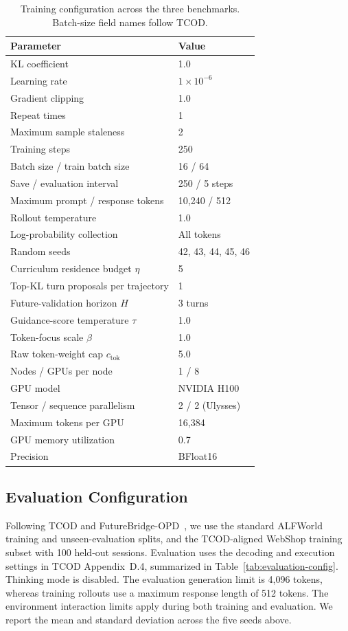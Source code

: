 \documentclass{article}
\begin{document}
\begin{table}[H]
\centering
\small
\caption{Training configuration across the three benchmarks. Batch-size field names follow TCOD.}
\label{tab:training-config}
\begin{tabular}{ll}
\toprule
Parameter & Value \\
\midrule
KL coefficient & 1.0 \\
Learning rate & $1\times10^{-6}$ \\
Gradient clipping & 1.0 \\
Repeat times & 1 \\
Maximum sample staleness & 2 \\
Training steps & 250 \\
Batch size / train batch size & 16 / 64 \\
Save / evaluation interval & 250 / 5 steps \\
Maximum prompt / response tokens & 10,240 / 512 \\
Rollout temperature & 1.0 \\
Log-probability collection & All tokens \\
Random seeds & 42, 43, 44, 45, 46 \\
\midrule
Curriculum residence budget $\eta$ & 5 \\
Top-KL turn proposals per trajectory & 1 \\
Future-validation horizon $H$ & 3 turns \\
Guidance-score temperature $\tau$ & 1.0 \\
Token-focus scale $\beta$ & 1.0 \\
Raw token-weight cap $c_{\mathrm{tok}}$ & 5.0 \\
\midrule
Nodes / GPUs per node & 1 / 8 \\
GPU model & NVIDIA H100 \\
Tensor / sequence parallelism & 2 / 2 (Ulysses) \\
Maximum tokens per GPU & 16,384 \\
GPU memory utilization & 0.7 \\
Precision & BFloat16 \\
\bottomrule
\end{tabular}
\end{table}

\subsection{Evaluation Configuration}
Following TCOD and FutureBridge-OPD~\citep{wang2026tcod,chen2026look}, we use the
standard ALFWorld training and unseen-evaluation splits, and the TCOD-aligned WebShop
training subset with 100 held-out sessions.  Evaluation uses the decoding and execution
settings in TCOD Appendix~D.4, summarized in Table~\ref{tab:evaluation-config}. Thinking
mode is disabled. The evaluation generation limit is 4,096 tokens, whereas training rollouts
use a maximum response length of 512 tokens. The environment interaction limits apply during
both training and evaluation. We report the mean and standard deviation across the five seeds above.
\end{document}
